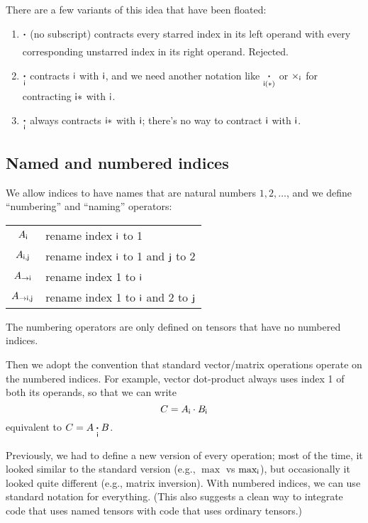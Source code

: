 \documentclass{article}
\begin{document}
There are a few variants of this idea that have been floated:
\begin{enumerate}
\item $\mathbin{\mathop{\boldsymbol\cdot}\limits_{\mathsf{}}}$ (no subscript) contracts every starred index in its left operand with every corresponding unstarred index in its right operand. Rejected.
\item $\mathbin{\mathop{\boldsymbol\cdot}\limits_{\mathsf{i}}}$ contracts $\mathsf{i}$ with $\mathsf{i}$, and we need another notation like $\mathbin{\mathop{\boldsymbol\cdot}\limits_{\mathsf{i(*)}}}$ or $\mathop\times\displaylimits_{\mathsf{i}}$ for contracting $\mathsf{i*}$ with $\mathsf{i}$.
\item $\mathbin{\mathop{\boldsymbol\cdot}\limits_{\mathsf{i}}}$ always contracts $\mathsf{i*}$ with $\mathsf{i}$; there's no way to contract $\mathsf{i}$ with $\mathsf{i}$.
\end{enumerate}

\subsection{Named and numbered indices}
\label{sec:tensorsoftensors}

We allow indices to have names that are natural numbers $1, 2, \ldots$, and we define ``numbering'' and ``naming'' operators:
\begin{center}
\begin{tabular}{cl}
$A_{\mathsf{i}}$ & rename index $\mathsf{i}$ to 1 \\
$A_{\mathsf{i},\mathsf{j}}$ & rename index $\mathsf{i}$ to 1 and $\mathsf{j}$ to 2 \\
$A_{\rightarrow\mathsf{i}}$ & rename index 1 to $\mathsf{i}$ \\
$A_{\rightarrow\mathsf{i},\mathsf{j}}$ & rename index 1 to $\mathsf{i}$ and 2 to $\mathsf{j}$
\end{tabular}
\end{center}
The numbering operators are only defined on tensors that have no numbered indices.

Then we adopt the convention that standard vector/matrix operations operate on the numbered indices. For example, vector dot-product always uses index 1 of both its operands, so that we can write
\begin{equation*}
C = A_{\mathsf{i}} \cdot B_{\mathsf{i}}
\end{equation*}
equivalent to $C = A \mathbin{\mathop{\boldsymbol\cdot}\limits_{\mathsf{i}}} B$. 

Previously, we had to define a new version of every operation; most of the time, it looked similar to the standard version (e.g., $\max$ vs $\max_{\mathsf{i}}$), but occasionally it looked quite different (e.g., matrix inversion). With numbered indices, we can use standard notation for everything.
(This also suggests a clean way to integrate code that uses named tensors with code that uses ordinary tensors.)
\end{document}
